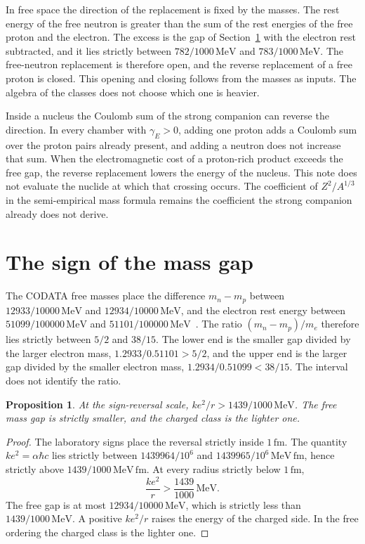 \documentclass[a4paper]{article}
\newtheorem{proposition}[lemma]{Proposition}
\begin{document}
In free space the direction of the replacement is fixed by the masses. The rest energy of the free neutron is greater than the sum of the rest energies of the free proton and the electron. The excess is the gap of Section~\ref{sec:gap} with the electron rest subtracted, and it lies strictly between \(782/1000\,\mathrm{MeV}\) and \(783/1000\,\mathrm{MeV}\). The free-neutron replacement is therefore open, and the reverse replacement of a free proton is closed. This opening and closing follows from the masses as inputs. The algebra of the classes does not choose which one is heavier.

Inside a nucleus the Coulomb sum of the strong companion can reverse the direction. In every chamber with \(\gamma_E>0\), adding one proton adds a Coulomb sum over the proton pairs already present, and adding a neutron does not increase that sum. When the electromagnetic cost of a proton-rich product exceeds the free gap, the reverse replacement lowers the energy of the nucleus. This note does not evaluate the nuclide at which that crossing occurs. The coefficient of \(Z^{2}/A^{1/3}\) in the semi-empirical mass formula remains the coefficient the strong companion already does not derive.

\section{The sign of the mass gap}
\label{sec:gap}

The CODATA free masses place the difference \(m_n-m_p\) between \(12933/10000\,\mathrm{MeV}\) and \(12934/10000\,\mathrm{MeV}\), and the electron rest energy between \(51099/100000\,\mathrm{MeV}\) and \(51101/100000\,\mathrm{MeV}\)~\cite{codata2018}. The ratio \((m_n-m_p)/m_e\) therefore lies strictly between \(5/2\) and \(38/15\). The lower end is the smaller gap divided by the larger electron mass, \(1.2933/0.51101>5/2\), and the upper end is the larger gap divided by the smaller electron mass, \(1.2934/0.51099<38/15\). The interval does not identify the ratio.

\begin{proposition}
\label{prop:sign}
At the sign-reversal scale, \(ke^{2}/r>1439/1000\,\mathrm{MeV}\). The free mass gap is strictly smaller, and the charged class is the lighter one.
\end{proposition}

\begin{proof}
The laboratory signs place the reversal strictly inside \(1\,\mathrm{fm}\). The quantity \(ke^{2}=\alpha\hbar c\) lies strictly between \(1439964/10^{6}\) and \(1439965/10^{6}\,\mathrm{MeV\,fm}\), hence strictly above \(1439/1000\,\mathrm{MeV\,fm}\). At every radius strictly below \(1\,\mathrm{fm}\),
\[
\frac{ke^{2}}{r}>\frac{1439}{1000}\,\mathrm{MeV}.
\]
The free gap is at most \(12934/10000\,\mathrm{MeV}\), which is strictly less than \(1439/1000\,\mathrm{MeV}\). A positive \(ke^{2}/r\) raises the energy of the charged side. In the free ordering the charged class is the lighter one.
\end{proof}
\end{document}
